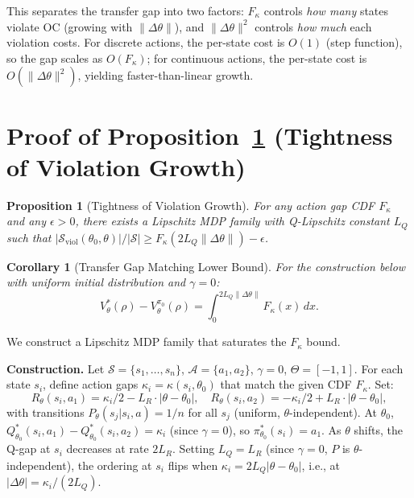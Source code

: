 \documentclass{article}
\newtheorem{proposition}{Proposition}
\newtheorem{corollary}{Corollary}
\newcommand{\cS}{\mathcal{S}}
\newcommand{\cA}{\mathcal{A}}
\newcommand{\Sviol}{\mathcal{S}_{\mathrm{viol}}}
\begin{document}
This separates the transfer gap into two factors: $F_\kappa$ controls \emph{how many} states violate OC (growing with $\|\Delta\theta\|$), and $\|\Delta\theta\|^2$ controls \emph{how much} each violation costs. For discrete actions, the per-state cost is $O(1)$ (step function), so the gap scales as $O(F_\kappa)$; for continuous actions, the per-state cost is $O(\|\Delta\theta\|^2)$, yielding faster-than-linear growth.

\section{Proof of Proposition~\ref{prop:tight-growth} (Tightness of Violation Growth)}
\label{app:tight-growth}

\begin{proposition}[Tightness of Violation Growth]
\label{prop:tight-growth}
For any action gap CDF $F_\kappa$ and any $\epsilon > 0$, there exists a Lipschitz MDP family with Q-Lipschitz constant $L_Q$ such that $|\Sviol(\theta_0, \theta)| / |\cS| \geq F_\kappa(2L_Q\|\Delta\theta\|) - \epsilon$.
\end{proposition}

\begin{corollary}[Transfer Gap Matching Lower Bound]
\label{cor:transfer-gap-lower}
For the construction below with uniform initial distribution and $\gamma = 0$:
\[
V^*_\theta(\rho) - V^{\pi_0}_\theta(\rho) = \int_0^{2L_Q\|\Delta\theta\|}\!\! F_\kappa(x)\, dx.
\]
\end{corollary}

We construct a Lipschitz MDP family that saturates the $F_\kappa$ bound.

\textbf{Construction.} Let $\cS = \{s_1, \ldots, s_n\}$, $\cA = \{a_1, a_2\}$, $\gamma = 0$, $\Theta = [-1, 1]$. For each state $s_i$, define action gaps $\kappa_i = \kappa(s_i, \theta_0)$ that match the given CDF $F_\kappa$. Set:
\begin{equation}
R_\theta(s_i, a_1) = \kappa_i/2 - L_R \cdot |\theta - \theta_0|, \quad R_\theta(s_i, a_2) = -\kappa_i/2 + L_R \cdot |\theta - \theta_0|,
\end{equation}
with transitions $P_\theta(s_j|s_i, a) = 1/n$ for all $s_j$ (uniform, $\theta$-independent). At $\theta_0$, $Q^*_{\theta_0}(s_i, a_1) - Q^*_{\theta_0}(s_i, a_2) = \kappa_i$ (since $\gamma = 0$), so $\pi^*_{\theta_0}(s_i) = a_1$. As $\theta$ shifts, the Q-gap at $s_i$ decreases at rate $2L_R$. Setting $L_Q = L_R$ (since $\gamma = 0$, $P$ is $\theta$-independent), the ordering at $s_i$ flips when $\kappa_i = 2L_Q|\theta - \theta_0|$, i.e., at $|\Delta\theta| = \kappa_i / (2L_Q)$.
\end{document}
